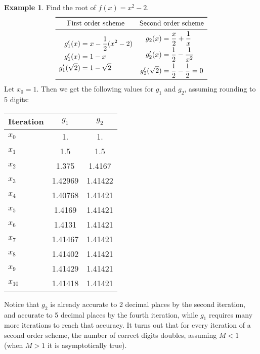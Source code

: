 \documentclass[12pt,letterpaper,DIV=11]{scrartcl}
\theoremstyle{plain}
\theoremstyle{definition}
\newtheorem{example}{Example}[section]
\theoremstyle{remark}
\begin{document}
\begin{example}
  Find the root of $f(x) = x^2 - 2$.
  \begin{displaymath}
    \begin{array}{c c}
      \toprule
      \text{First order scheme} & \text{Second order scheme} \\
      \midrule
      \begin{aligned}
        g'_1(x) &= x - \frac{1}{2} (x^2 - 2) \\
        g'_1(x) &= 1 - x \\
        g'_1(\sqrt{2}) &= 1 - \sqrt{2}
      \end{aligned} &
      \begin{aligned}
        g_2(x) &= \frac{x}{2} + \frac{1}{x} \\
        g'_2(x) &= \frac{1}{2} - \frac{1}{x^2} \\
        g'_2(\sqrt{2}) &= \frac{1}{2} - \frac{1}{2} = 0
      \end{aligned} \\
      \bottomrule
    \end{array}
  \end{displaymath}
  Let $x_0 = 1$.
  Then we get the following values for $g_1$ and $g_2$, assuming rounding to 5 digits:
  \begin{table}[h]
    \centering
    \begin{tabular}{l S S}
      \toprule
      Iteration & {$g_1$} & {$g_2$} \\
      \midrule
      $x_0$ & 1. & 1. \\
      $x_1$ & 1.5 & 1.5 \\
      $x_2$ & 1.375 & 1.4167 \\
      $x_3$ & 1.42969 & 1.41422 \\
      $x_4$ & 1.40768 & 1.41421 \\
      $x_5$ & 1.4169 & 1.41421 \\
      $x_6$ & 1.4131 & 1.41421 \\
      $x_7$ & 1.41467 & 1.41421 \\
      $x_8$ & 1.41402 & 1.41421 \\
      $x_9$ & 1.41429 & 1.41421 \\
      $x_{10}$ & 1.41418 & 1.41421 \\
      \bottomrule
    \end{tabular}
  \end{table}

  Notice that $g_2$ is already accurate to 2 decimal places by the second iteration, and accurate to 5 decimal places by the fourth iteration, while $g_1$ requires many more iterations to reach that accuracy.
  It turns out that for every iteration of a second order scheme, the number of correct digits doubles, assuming $M < 1$ (when $M > 1$ it is asymptotically true).


\end{example}
\end{document}
